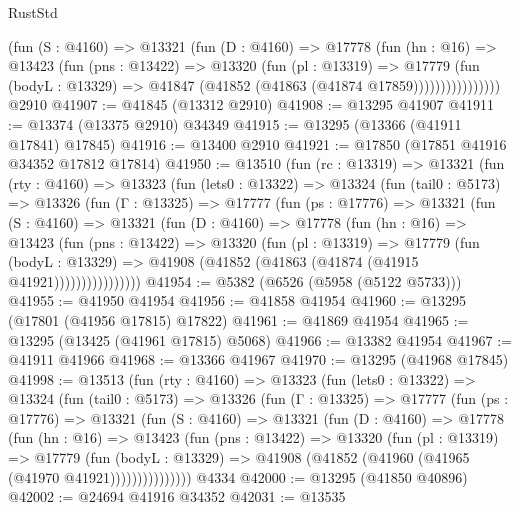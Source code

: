 \begin{lexlean}{RustStd}
\begin{coremodule}
                  (fun (S : @4160) =>
                  @13321
                    (fun (D : @4160) =>
                    @17778
                      (fun (hn : @16) =>
                      @13423
                        (fun (pns : @13422) =>
                        @13320
                          (fun (pl : @13319) =>
                          @17779
                            (fun (bodyL : @13329) =>
                            @41847 (@41852 (@41863 (@41874 @17859))))))))))))))))
    @2910
@41907 := @41845 (@13312 @2910)
@41908 := @13295 @41907
@41911 := @13374 (@13375 @2910) @34349
@41915 := @13295 (@13366 (@41911 @17841) @17845)
@41916 := @13400 @2910
@41921 := @17850 (@17851 @41916 @34352 @17812 @17814)
@41950 := @13510
    (fun (rc : @13319) =>
    @13321
      (fun (rty : @4160) =>
      @13323
        (fun (lets0 : @13322) =>
        @13324
          (fun (tail0 : @5173) =>
          @13326
            (fun (Γ : @13325) =>
            @17777
              (fun (ps : @17776) =>
              @13321
                (fun (S : @4160) =>
                @13321
                  (fun (D : @4160) =>
                  @17778
                    (fun (hn : @16) =>
                    @13423
                      (fun (pns : @13422) =>
                      @13320
                        (fun (pl : @13319) =>
                        @17779
                          (fun (bodyL : @13329) =>
                          @41908 (@41852 (@41863 (@41874 (@41915 @41921))))))))))))))))
@41954 := @5382 (@6526 (@5958 (@5122 @5733)))
@41955 := @41950 @41954
@41956 := @41858 @41954
@41960 := @13295 (@17801 (@41956 @17815) @17822)
@41961 := @41869 @41954
@41965 := @13295 (@13425 (@41961 @17815) @5068)
@41966 := @13382 @41954
@41967 := @41911 @41966
@41968 := @13366 @41967
@41970 := @13295 (@41968 @17845)
@41998 := @13513
    (fun (rty : @4160) =>
    @13323
      (fun (lets0 : @13322) =>
      @13324
        (fun (tail0 : @5173) =>
        @13326
          (fun (Γ : @13325) =>
          @17777
            (fun (ps : @17776) =>
            @13321
              (fun (S : @4160) =>
              @13321
                (fun (D : @4160) =>
                @17778
                  (fun (hn : @16) =>
                  @13423
                    (fun (pns : @13422) =>
                    @13320
                      (fun (pl : @13319) =>
                      @17779
                        (fun (bodyL : @13329) =>
                        @41908 (@41852 (@41960 (@41965 (@41970 @41921)))))))))))))))
    @4334
@42000 := @13295 (@41850 @40896)
@42002 := @24694 @41916 @34352
@42031 := @13535

\end{coremodule}
\end{lexlean}
